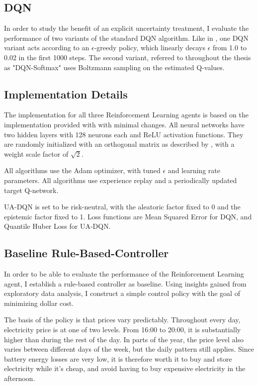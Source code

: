 \subsection{DQN}
In order to study the benefit of an explicit uncertainty treatment, I evaluate the performance of two variants of the standard DQN algorithm.
Like in \cite{clements2020EstimatingRiskUncertainty}, one DQN variant acts according to an $\epsilon$-greedy policy, which linearly decays $\epsilon$ from 1.0 to 0.02 in the first 1000 steps.
The second variant, referred to throughout the thesis as "DQN-Softmax" uses Boltzmann sampling on the estimated Q-values.

\subsection{Implementation Details}
The implementation for all three Reinforcement Learning agents is based on the implementation provided with \cite{clements2020EstimatingRiskUncertainty} with minimal changes.
All neural networks have two hidden layers with 128 neurons each and ReLU activation functions.
They are randomly initialized with an orthogonal matrix as described by \cite{saxe2014ExactSolutionsNonlinear}, with a weight scale factor of $\sqrt{2}$.

All algorithms use the Adam optimizer, with tuned $\epsilon$ and learning rate parameters.
All algorithms use experience replay and a periodically updated target Q-network.

UA-DQN is set to be risk-neutral, with the aleatoric factor fixed to 0 and the epistemic factor fixed to 1.
Loss functions are Mean Squared Error for DQN, and Quantile Huber Loss for UA-DQN.

\subsection{Baseline Rule-Based-Controller}
In order to be able to evaluate the performance of the Reinforcement Learning agent, I establish a rule-based controller as baseline.
Using insights gained from exploratory data analysis, I construct a simple control policy with the goal of minimizing dollar cost.

The basis of the policy is that prices vary predictably.
Throughout every day, electricity price is at one of two levels.
From 16:00 to 20:00, it is substantially higher than during the rest of the day.
In parts of the year, the price level also varies between different days of the week, but the daily pattern still applies.
Since battery energy losses are very low, it is therefore worth it to buy and store electricity while it's cheap, and avoid having to buy expensive electricity in the afternoon.

